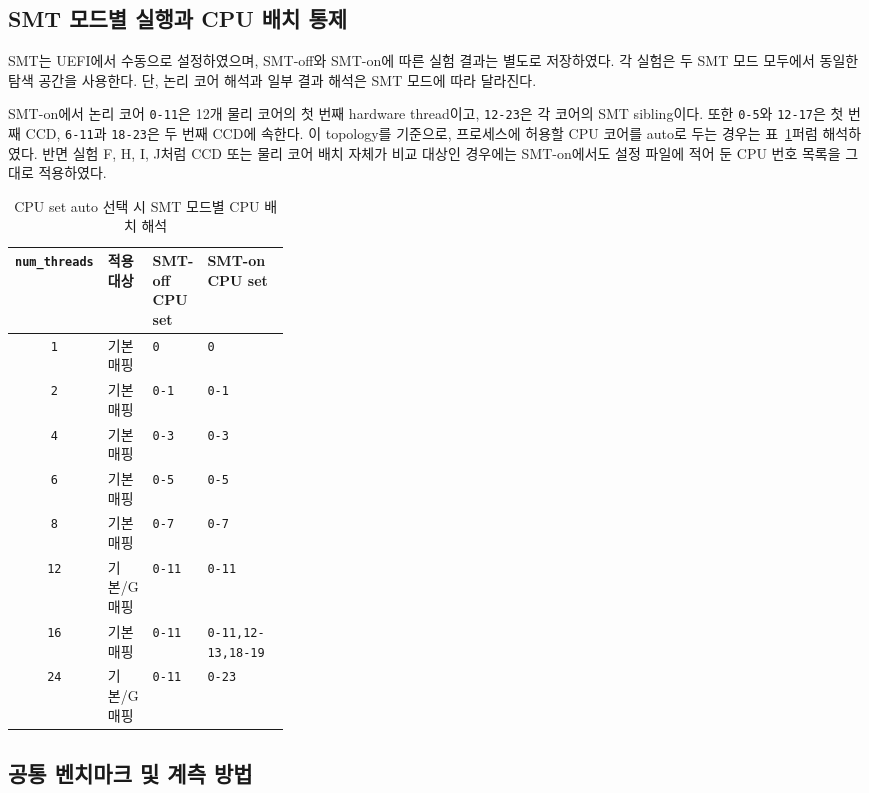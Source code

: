\documentclass[11pt,a4paper]{article}
\begin{document}
\subsection{SMT 모드별 실행과 CPU 배치 통제}

SMT는 UEFI에서 수동으로 설정하였으며, SMT-off와 SMT-on에 따른 실험 결과는 별도로 저장하였다. 각 실험은 두 SMT 모드 모두에서 동일한 탐색 공간을 사용한다. 단, 논리 코어 해석과 일부 결과 해석은 SMT 모드에 따라 달라진다.

SMT-on에서 논리 코어 \texttt{0-11}은 12개 물리 코어의 첫 번째 hardware thread이고, \texttt{12-23}은 각 코어의 SMT sibling이다. 또한 \texttt{0-5}와 \texttt{12-17}은 첫 번째 CCD, \texttt{6-11}과 \texttt{18-23}은 두 번째 CCD에 속한다. 이 topology를 기준으로, 프로세스에 허용할 CPU 코어를 auto로 두는 경우는  표~\ref{tab:smt-affinity-summary}퍼럼 해석하였다. 반면 실험 F, H, I, J처럼 CCD 또는 물리 코어 배치 자체가 비교 대상인 경우에는 SMT-on에서도 설정 파일에 적어 둔 CPU 번호 목록을 그대로 적용하였다.

\begin{table}[h]
\centering
\begin{tabular}{cllp{0.32\linewidth}}
\toprule
\texttt{num\_threads} & 적용 대상 & SMT-off CPU set & SMT-on CPU set \\
\midrule
\texttt{1}  & 기본 매핑 & \texttt{0}    & \texttt{0} \\
\texttt{2}  & 기본 매핑 & \texttt{0-1}  & \texttt{0-1} \\
\texttt{4}  & 기본 매핑 & \texttt{0-3}  & \texttt{0-3} \\
\texttt{6}  & 기본 매핑 & \texttt{0-5}  & \texttt{0-5} \\
\texttt{8}  & 기본 매핑 & \texttt{0-7}  & \texttt{0-7} \\
\texttt{12} & 기본/G 매핑 & \texttt{0-11} & \texttt{0-11} \\
\texttt{16} & 기본 매핑 & \texttt{0-11} & \texttt{0-11,12-13,18-19} \\
\texttt{24} & 기본/G 매핑 & \texttt{0-11} & \texttt{0-23} \\
\bottomrule
\end{tabular}
\caption{CPU set auto 선택 시 SMT 모드별 CPU 배치 해석}
\label{tab:smt-affinity-summary}
\end{table}

\subsection{공통 벤치마크 및 계측 방법}
\end{document}
